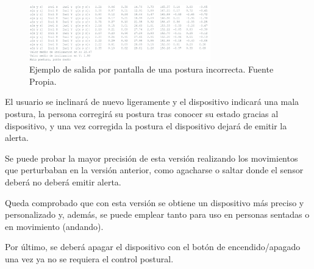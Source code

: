 \begin{figure}[h!]
    \centering
    \includegraphics[width=0.7\textwidth]{img/PantallaPosturaInc.png}
    \caption{Ejemplo de salida por pantalla de una postura incorrecta. Fuente Propia.}
    \label{fig:imgV2_posturaInc_Pantalla} 
\end{figure}

El usuario se inclinará de nuevo ligeramente y el dispositivo indicará una mala postura, la persona corregirá su postura tras conocer su estado gracias al dispositivo, y una vez corregida la postura el dispositivo dejará de emitir la alerta.

Se puede probar la mayor precisión de esta versión realizando los movimientos que perturbaban en la versión anterior, como agacharse o saltar donde el sensor deberá no deberá emitir alerta.

Queda comprobado que con esta versión se obtiene un dispositivo más preciso y personalizado y, además, se puede emplear tanto para uso en personas sentadas o en movimiento (andando).

Por último, se deberá apagar el dispositivo con el botón de encendido/apagado una vez ya no se requiera el control postural.

